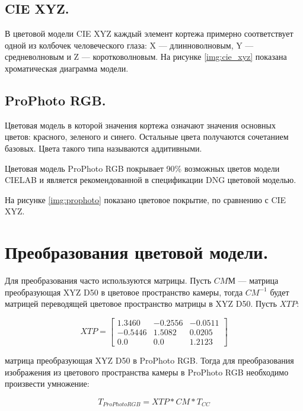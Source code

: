 \subsection{CIE XYZ.}
В цветовой модели CIE XYZ каждый элемент кортежа примерно соответствует одной из колбочек человеческого глаза: X --- длинноволновым, Y --- средневолновым и Z --- коротковолновым. На рисунке \ref{img:cie_xyz} показана хроматическая диаграмма модели.


\subsection{ProPhoto RGB.}
Цветовая модель в которой значения кортежа означают значения основных цветов: красного, зеленого и синего. Остальные цвета получаются сочетанием базовых. Цвета такого типа называются аддитивными.

Цветовая модель ProPhoto RGB покрывает 90\% возможных цветов модели CIELAB и является рекомендованной в спецификации DNG цветовой моделью. \cite{dngspec}

 На рисунке \ref{img:prophoto} показано цветовое покрытие, по сравнению с CIE XYZ.


\section{Преобразования цветовой модели.}

Для преобразования часто используются матрицы. Пусть $CMМ$ --- матрица преобразующая XYZ D50 в цветовое пространство камеры, тогда $CM^{-1}$ будет матрицей переводящей цветовое пространство матрицы в XYZ D50. Пусть $XTP$:

\begin{equation}
	\label{XTP}
	XTP = \begin{bmatrix}
			1.3460 & -0.2556 & -0.0511 \\
			-0.5446 & 1.5082 & 0.0205 \\
			0.0 & 0.0 & 1.2123 
		\end{bmatrix}
\end{equation}

матрица преобразующая XYZ D50 в ProPhoto RGB. Тогда для преобразования изображения из цветового пространства камеры в ProPhoto RGB необходимо произвести умножение:

\begin{equation}
	\label{tosrgb}
	T_{ProPhoto RGB} = XTP * CM * T_{CC}
\end{equation}

